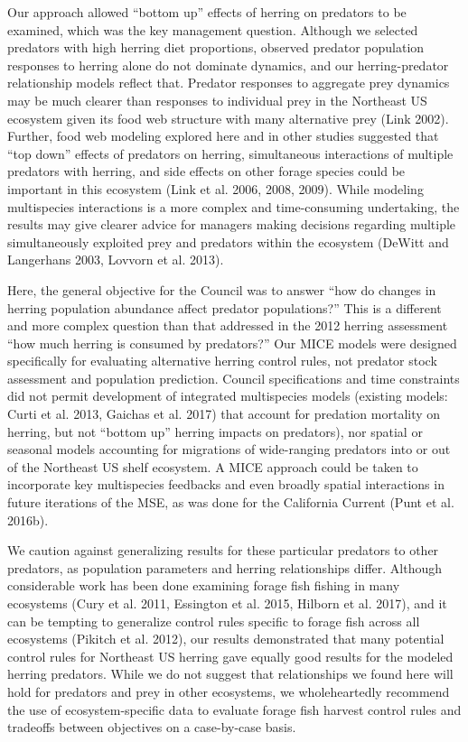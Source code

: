 \documentclass[]{article}
\begin{document}
Our approach allowed ``bottom up'' effects of herring on predators to be
examined, which was the key management question. Although we selected
predators with high herring diet proportions, observed predator
population responses to herring alone do not dominate dynamics, and our
herring-predator relationship models reflect that. Predator responses to
aggregate prey dynamics may be much clearer than responses to individual
prey in the Northeast US ecosystem given its food web structure with
many alternative prey (Link 2002). Further, food web modeling explored
here and in other studies suggested that ``top down'' effects of
predators on herring, simultaneous interactions of multiple predators
with herring, and side effects on other forage species could be
important in this ecosystem (Link et al. 2006, 2008, 2009). While
modeling multispecies interactions is a more complex and time-consuming
undertaking, the results may give clearer advice for managers making
decisions regarding multiple simultaneously exploited prey and predators
within the ecosystem (DeWitt and Langerhans 2003, Lovvorn et al. 2013).

Here, the general objective for the Council was to answer ``how do
changes in herring population abundance affect predator populations?''
This is a different and more complex question than that addressed in the
2012 herring assessment ``how much herring is consumed by predators?''
Our MICE models were designed specifically for evaluating alternative
herring control rules, not predator stock assessment and population
prediction. Council specifications and time constraints did not permit
development of integrated multispecies models (existing models: Curti et
al. 2013, Gaichas et al. 2017) that account for predation mortality on
herring, but not ``bottom up'' herring impacts on predators), nor
spatial or seasonal models accounting for migrations of wide-ranging
predators into or out of the Northeast US shelf ecosystem. A MICE
approach could be taken to incorporate key multispecies feedbacks and
even broadly spatial interactions in future iterations of the MSE, as
was done for the California Current (Punt et al. 2016b).

We caution against generalizing results for these particular predators
to other predators, as population parameters and herring relationships
differ. Although considerable work has been done examining forage fish
fishing in many ecosystems (Cury et al. 2011, Essington et al. 2015,
Hilborn et al. 2017), and it can be tempting to generalize control rules
specific to forage fish across all ecosystems (Pikitch et al. 2012), our
results demonstrated that many potential control rules for Northeast US
herring gave equally good results for the modeled herring predators.
While we do not suggest that relationships we found here will hold for
predators and prey in other ecosystems, we wholeheartedly recommend the
use of ecosystem-specific data to evaluate forage fish harvest control
rules and tradeoffs between objectives on a case-by-case basis.
\end{document}
